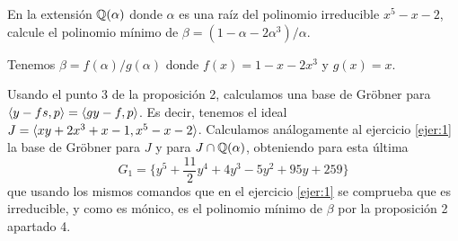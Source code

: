\documentclass[twoside]{article}
\begin{document}
\begin{ejercicio}{2}
En la extensión $\mathbb{Q}(\alpha)$ donde $\alpha$ es una raíz del polinomio irreducible $x^5-x-2$, calcule el polinomio mínimo de $\beta=(1-\alpha-2\alpha^3)/\alpha$. 
\end{ejercicio}
\begin{solucion}

Tenemos $\beta=f(\alpha)/g(\alpha)$ donde $f(x)=1-x-2x^3$ y $g(x)=x$. 

Usando el punto 3 de la proposición 2, calculamos una base de Gröbner para $\langle{y-fs,p}\rangle=\langle{gy-f,p}\rangle$. Es decir, tenemos el ideal $J=\langle{xy+2x^3+x-1,x^5-x-2}\rangle$. Calculamos análogamente al ejercicio \ref{ejer:1} la base de Gröbner para $J$ y para $J\cap \mathbb{Q}(\alpha)$, obteniendo para esta última
\[
G_1=\{y^5 + \frac{11}{2}y^4 + 4y^3 - 5y^2 + 95y + 259\}
\]
que usando los mismos comandos que en el ejercicio \ref{ejer:1} se comprueba que es irreducible, y como es mónico, es el polinomio mínimo de $\beta$ por la proposición 2 apartado 4. 
\end{solucion}
\end{document}
